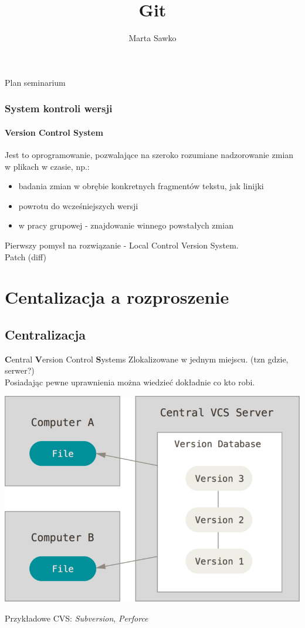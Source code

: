 \documentclass{beamer}
\title{Git}
\author{Marta Sawko}
\begin{document}
\frame{\titlepage}
\begin{frame}{Plan seminarium}
  \tableofcontents
\end{frame}

\begin{frame}
 \frametitle{System kontroli wersji}
 \framesubtitle{\textbf{V}ersion \textbf{C}ontrol \textbf{S}ystem}
 Jest to oprogramowanie, pozwalające na szeroko rozumiane nadzorowanie zmian w plikach w czasie, np.:
 \begin{itemize}
  \item badania zmian w obrębie konkretnych fragmentów tekstu, jak linijki
  \item powrotu do wcześniejszych wersji 
  \item w pracy grupowej - znajdowanie winnego powstałych zmian
 \end{itemize} 
 Pierwszy pomysł na rozwiązanie - Local Control Version System.\\
 Patch (diff)
\end{frame}

\section{Centalizacja a rozproszenie}
\subsection{Centralizacja}
\begin{frame}{\textbf{C}entral \textbf{V}ersion Control \textbf{S}ystems}
  Zlokalizowane w jednym miejscu. (tzn gdzie, serwer?) \\
  Posiadając pewne uprawnienia można wiedzieć dokładnie co kto robi.\\
  \begin{center}
   \includegraphics[height=0.4\textwidth]{./obrazki/fig-1_2.png}
 \end{center}
  Przykładowe CVS\@: \textit{Subversion}, \textit{Perforce}
\end{frame}
\end{document}
